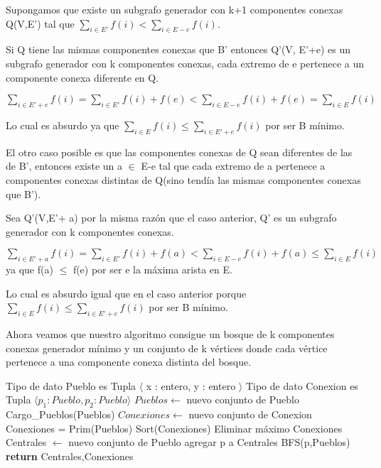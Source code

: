 Supongamos que existe un subgrafo generador con k+1 componentes conexas Q(V,E') tal que $\sum_{i \in E'} f(i) < \sum_{i \in E-e} f(i)$.

Si Q tiene las mismas componentes conexas que B' entonces Q'(V, E'+e) es un subgrafo generador con k componentes conexas, cada extremo de e pertenece a un componente conexa diferente en Q.

$\sum_{i \in E'+e} f(i) = \sum_{i \in E'} f(i) + f(e) < \sum_{i \in E-e} f(i) + f(e) = \sum_{i \in E} f(i)$

Lo cual es absurdo ya que $\sum_{i \in E} f(i) \leq \sum_{i \in E'+e} f(i)$ por ser B mínimo.

El otro caso posible es que las componentes conexas de Q sean diferentes de las de B', entonces existe un a $\in$ E-e tal que cada extremo de a pertenece a componentes conexas distintas de Q(sino tendía las mismas componentes conexas que B').

Sea Q'(V,E'+ a) por la misma razón que el caso anterior, Q' es un subgrafo generador con k componentes conexas.

$\sum_{i \in E'+a} f(i) = \sum_{i \in E'} f(i) + f(a) < \sum_{i \in E-e} f(i) + f(a) \leq \sum_{i \in E} f(i)$ ya que f(a) $\leq$ f(e) por ser e la máxima arista en E.

Lo cual es absurdo igual que en el caso anterior porque $\sum_{i \in E} f(i) \leq \sum_{i \in E'+e} f(i)$ por ser B mínimo.

Ahora veamos que nuestro algoritmo consigue un bosque de k componentes conexas generador mínimo y un conjunto de k vértices donde cada vértice pertenece a una componente conexa distinta del bosque.

\begin{center}
\begin{pseudo}
\State Tipo de dato Pueblo es Tupla $\langle$ x : entero, y : entero $\rangle$
\State Tipo de dato Conexion es Tupla $\langle p_1 : Pueblo, p_2 : Pueblo \rangle$
        \State $Pueblos \leftarrow$ nuevo conjunto de Pueblo 
        \State Cargo\_Pueblos(Pueblos) 
        \State $Conexiones \leftarrow$ nuevo conjunto de Conexion 
        \State Conexiones = Prim(Pueblos) 
        \State Sort(Conexiones) 
         
	  \State Eliminar máximo Conexiones 
	\EndFor
        \State Centrales $\leftarrow$ nuevo conjunto de Pueblo 
        \State agregar p a Centrales
        \State BFS(p,Pueblos)
        \EndWhile
        \State \textbf{return} Centrales,Conexiones 
    \EndProcedure
\end{pseudo}
\end{center}

